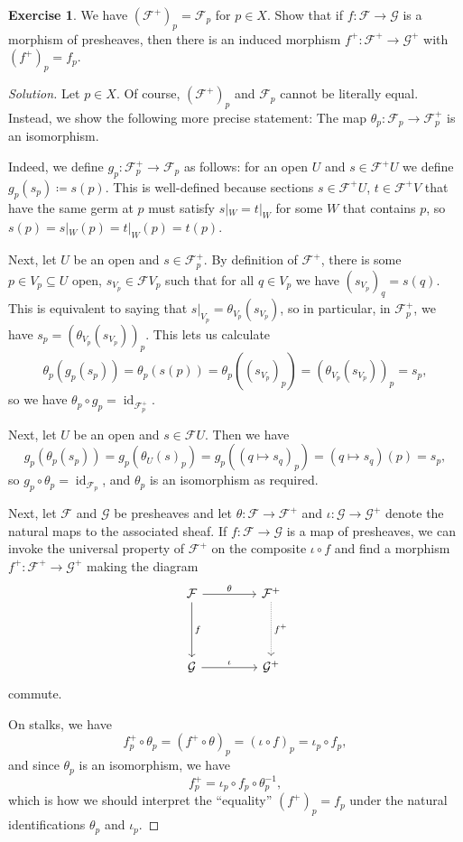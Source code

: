 \documentclass[a4paper]{amsbook}
\theoremstyle{definition}
\newtheorem*{exercise*}{Exercise}
\DeclareMathOperator\id{id}
\begin{document}
\begin{exercise*}
\label{Stalks}
We have $(\mathcal{F}^+)_p = \mathcal{F}_p$ for $p \in X$. Show that if $f\colon \mathcal{F}\to \mathcal{G}$ is
a morphism of presheaves, then there is an induced morphism $f^+\colon \mathcal{F}^+ \to \mathcal{G}^+$
with $(f^+)_p = f_p$.
\end{exercise*}
\begin{proof}[Solution]
Let $p \in X$. Of course, $(\mathcal{F}^+)_p$ and $\mathcal{F}_p$
cannot be literally equal. Instead, we show the following more precise
statement: The map $\theta_p\colon \mathcal{F}_p \to \mathcal{F}^+_p$ is an
isomorphism.

Indeed, we define $g_p\colon \mathcal{F}^+_p \to \mathcal{F}_p$ as follows:
for an open $U$ and $s \in \mathcal{F}^+U$ we define $g_p(s_p)\coloneqq s(p)$.
This is well-defined because sections $s \in \mathcal{F}^+U$,
$t \in \mathcal{F}^+V$
that have the same germ at $p$ must satisfy $s|_W = t|_W$ for some $W$ that contains
$p$, so  $s(p) = s|_W(p) = t|_W(p) = t(p)$.

Next, let $U$ be an open and $s \in \mathcal{F}_p^+$. By definition of $\mathcal{F}^+$,
there is some $p \in V_p \subseteq U$ open, $s_{V_p} \in \mathcal{F}V_p$ such that
for all $q \in V_p$ we have $(s_{V_p})_q = s(q)$. This is equivalent to saying
that $s|_{V_p} = \theta_{V_p}(s_{V_p})$, so in particular, in $\mathcal{F}_p^+$, we have
$s_p = (\theta_{V_p}(s_{V_p}))_p$. This lets us calculate
\[ \theta_p(g_p(s_p)) = \theta_p(s(p)) = \theta_p((s_{V_p})_p) = (\theta_{V_p}(s_{V_p}))_p = s_p, \]
so we have $\theta_p \circ g_p = \id_{\mathcal{F}^+_p}$.

Next, let $U$ be an open and $s \in \mathcal{F}U$. Then we have
\[ g_p(\theta_p(s_p)) = g_p(\theta_U(s)_p) = g_p((q\mapsto s_q)_p) = (q\mapsto s_q)(p) = s_p, \]
so $g_p \circ \theta_p = \id_{\mathcal{F}_p}$, and $\theta_p$ is an isomorphism as required.

Next, let $\mathcal{F}$ and $\mathcal{G}$ be presheaves and let $\theta\colon \mathcal{F}\to \mathcal{F}^+$
and $\iota\colon \mathcal{G}\to \mathcal{G}^+$ denote the natural maps to
the associated sheaf. If $f\colon \mathcal{F}\to \mathcal{G}$ is a map of presheaves,
we can invoke the universal property of $\mathcal{F}^+$ on the composite
$\iota \circ f$ and find a morphism
$f^+\colon \mathcal{F}^+ \to \mathcal{G}^+$ making the diagram
\[\begin{tikzcd}[row sep=1.5cm, column sep=1.5cm]
	\mathcal{F}\ar[r, "\theta"]\ar[d, "f"] & \mathcal{F}^+\ar[d, densely dotted, "f^+"]\\
	\mathcal{G}\ar[r, "\iota"] & \mathcal{G}^+
\end{tikzcd}\]
commute.

On stalks, we have
\[ f_p^+ \circ \theta_p = (f^+ \circ \theta)_p = (\iota \circ f)_p = \iota_p \circ f_p, \]
and since $\theta_p$ is an isomorphism, we have
\[ f_p^+ = \iota_p \circ f_p \circ \theta_p^{-1}, \]
which is how we should interpret the \enquote{equality} $(f^+)_p = f_p$ under the
natural identifications $\theta_p$ and $\iota_p$.
\end{proof}
\end{document}

